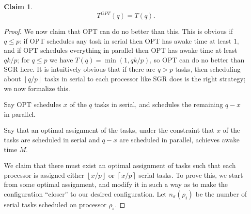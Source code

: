 \documentclass[twocolumn]{article}[10pt]
\newcommand{\floor}[1]{\left\lfloor #1 \right\rfloor}
\newcommand{\ceil}[1]{\left\lceil #1 \right\rceil}
\newtheorem{claim}{Claim}
\begin{document}
\begin{claim}
  \label{clm:opt_single}
  $$T^{OPT}(q) = T(q).$$
\end{claim}
\begin{proof}
  We now claim that OPT can do no better than this. This is
  obvious if $q \le p$: if OPT schedules any task in serial then
  OPT has awake time at least $1$, and if OPT schedules everything in
  parallel then OPT has awake time at least $qk/p$; for $q\le p$ we have
  $T(q) = \min(1, qk/p)$, so OPT can do no better than SGR here.
  It is intuitively obvious that if there are $q> p$ tasks, then
  scheduling about $\floor{q/p}$ tasks in serial to each
  processor like SGR does is the right strategy; we now formalize this.

  Say OPT schedules $x$ of the $q$ tasks in serial, and
  schedules the remaining $q-x$ in parallel.

  Say that an optimal assignment of the tasks, under the constraint
  that $x$ of the tasks are scheduled in serial and $q-x$ are
  scheduled in parallel, achieves awake time $M$.

  We claim that there must exist an optimal assignment of tasks
  such that each processor is assigned either $\floor{x/p}$ or
  $\ceil{x/p}$ serial tasks. To prove this, we start from some
  optimal assignment, and modify it in such a way as to make the
  configuration \enquote{closer} to our desired configuration.
  Let $n_\sigma(\rho_i)$ be the number of serial tasks scheduled
  on processor $\rho_i$.


\end{proof}
\end{document}
